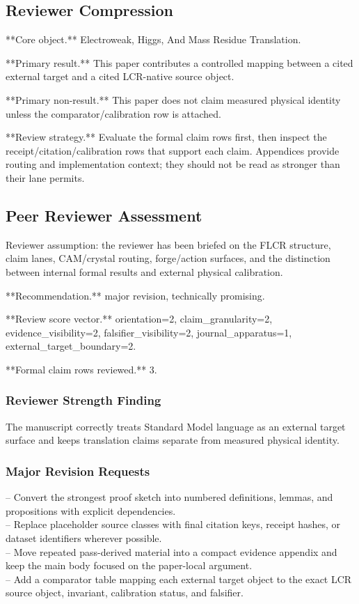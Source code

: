 \documentclass[11pt]{article}
\begin{document}
\subsection*{Reviewer Compression}

**Core object.** Electroweak, Higgs, And Mass Residue Translation.

**Primary result.** This paper contributes a controlled mapping between a cited external target and a cited LCR-native source object.

**Primary non-result.** This paper does not claim measured physical identity unless the comparator/calibration row is attached.

**Review strategy.** Evaluate the formal claim rows first, then inspect the receipt/citation/calibration rows that support each claim. Appendices provide routing and implementation context; they should not be read as stronger than their lane permits.

\subsection*{Peer Reviewer Assessment}

Reviewer assumption: the reviewer has been briefed on the FLCR structure, claim lanes, CAM/crystal routing, forge/action surfaces, and the distinction between internal formal results and external physical calibration.

**Recommendation.** major revision, technically promising.

**Review score vector.** orientation=2, claim\_granularity=2, evidence\_visibility=2, falsifier\_visibility=2, journal\_apparatus=1, external\_target\_boundary=2.

**Formal claim rows reviewed.** 3.

\subsubsection*{Reviewer Strength Finding}

The manuscript correctly treats Standard Model language as an external target surface and keeps translation claims separate from measured physical identity.

\subsubsection*{Major Revision Requests}

\noindent{}-- Convert the strongest proof sketch into numbered definitions, lemmas, and propositions with explicit dependencies.\\
\noindent{}-- Replace placeholder source classes with final citation keys, receipt hashes, or dataset identifiers wherever possible.\\
\noindent{}-- Move repeated pass-derived material into a compact evidence appendix and keep the main body focused on the paper-local argument.\\
\noindent{}-- Add a comparator table mapping each external target object to the exact LCR source object, invariant, calibration status, and falsifier.\\
\end{document}

